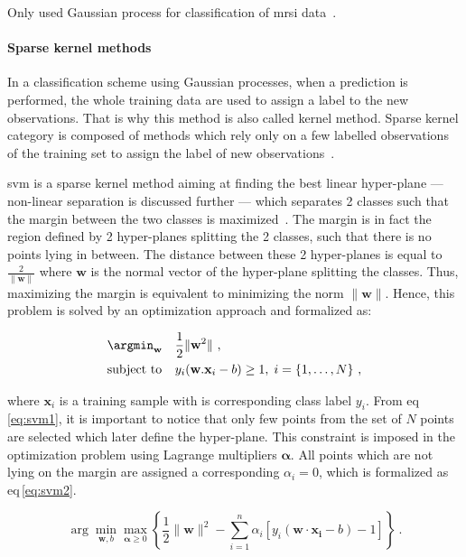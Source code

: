 Only \citeauthor{Kelm2007} used Gaussian process for classification of \ac{mrsi} data~\cite{Kelm2007}.

\paragraph{Sparse kernel methods}
In a classification scheme using Gaussian processes, when a prediction is performed, the whole training data are used to assign a label to the new observations.
That is why this method is also called kernel method.
Sparse kernel category is composed of methods which rely only on a few labelled observations of the training set to assign the label of new observations~\cite{Bishop2006}.

\Acf{svm} is a sparse kernel method aiming at finding the best linear hyper-plane --- non-linear separation is discussed further --- which separates 2 classes such that the margin between the two classes is maximized~\cite{Vapnik1963}.
The margin is in fact the region defined by 2 hyper-planes splitting the 2 classes, such that there is no points lying in between.
The distance between these 2 hyper-planes is equal to $\frac{2}{\|\mathbf{w}\|}$ where $\mathbf{w}$ is the normal vector of the hyper-plane splitting the classes.
Thus, maximizing the margin is equivalent to minimizing the norm $\|\mathbf{w}\|$.
Hence, this problem is solved by an optimization approach and formalized as:

\begin{equation}
\begin{aligned}
& \argmin_{\mathbf{w}}
& & \frac{1}{2} \| \mathbf{w}^2\| \ , \\
& \text{subject to}
& & y_i(\mathbf{w}.\mathbf{x}_i - b) \geq 1, \; i = \{ 1, \ldots, N \} \ ,
\end{aligned}
\label{eq:svm1}
\end{equation}

\noindent where $\mathbf{x}_i$ is a training sample with is corresponding class label $y_i$.
From \acs{eq}\,\eqref{eq:svm1}, it is important to notice that only few points from the set of $N$ points are selected which later define the hyper-plane.
This constraint is imposed in the optimization problem using Lagrange multipliers $\boldsymbol{\alpha}$.
All points which are not lying on the margin are assigned a corresponding $\alpha_i = 0$, which is formalized as \acs{eq}\,\eqref{eq:svm2}.

\begin{equation}
	\arg\min_{\mathbf{w},b } \max_{\boldsymbol{\alpha}\geq 0 } \left\{ \frac{1}{2}\|\mathbf{w}\|^2 - \sum_{i=1}^{n}{\alpha_i[y_i(\mathbf{w}\cdot \mathbf{x_i} - b)-1]} \right\} \ .
	\label{eq:svm2}
\end{equation}

